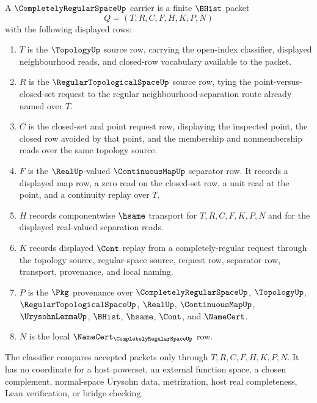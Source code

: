 \begin{definition}
\label{def:completely-regular-space-carrier}
A $\CompletelyRegularSpaceUp$ carrier is a finite $\BHist$ packet
$$
Q=(T,R,C,F,H,K,P,N)
$$
with the following displayed rows:
\begin{enumerate}
\item $T$ is the $\TopologyUp$ source row, carrying the open-index classifier, displayed neighbourhood reads, and closed-row vocabulary available to the packet.
\item $R$ is the $\RegularTopologicalSpaceUp$ source row, tying the point-versus-closed-set request to the regular neighbourhood-separation route already named over $T$.
\item $C$ is the closed-set and point request row, displaying the inspected point, the closed row avoided by that point, and the membership and nonmembership reads over the same topology source.
\item $F$ is the $\RealUp$-valued $\ContinuousMapUp$ separator row. It records a displayed map row, a zero read on the closed-set row, a unit read at the point, and a continuity replay over $T$.
\item $H$ records componentwise $\hsame$ transport for $T,R,C,F,K,P,N$ and for the displayed real-valued separation reads.
\item $K$ records displayed $\Cont$ replay from a completely-regular request through the topology source, regular-space source, request row, separator row, transport, provenance, and local naming.
\item $P$ is the $\Pkg$ provenance over $\CompletelyRegularSpaceUp$, $\TopologyUp$, $\RegularTopologicalSpaceUp$, $\RealUp$, $\ContinuousMapUp$, $\UrysohnLemmaUp$, $\BHist$, $\hsame$, $\Cont$, and $\NameCert$.
\item $N$ is the local $\NameCert_{\CompletelyRegularSpaceUp}$ row.
\end{enumerate}
The classifier compares accepted packets only through $T,R,C,F,H,K,P,N$. It has no coordinate for a host powerset, an external function space, a chosen complement, normal-space Urysohn data, metrization, host real completeness, Lean verification, or bridge checking.
\end{definition}

